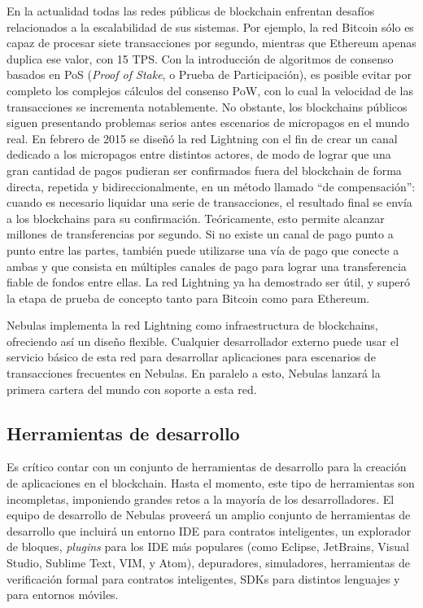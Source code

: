 En la actualidad todas las redes públicas de blockchain enfrentan desafíos relacionados a la escalabilidad de sus sistemas. Por ejemplo, la red Bitcoin sólo es capaz de procesar siete transacciones por segundo, mientras que Ethereum apenas duplica ese valor, con 15 TPS. Con la introducción de algoritmos de consenso basados en PoS (\textit{Proof of Stake}, o Prueba de Participación), es posible evitar por completo los complejos cálculos del consenso PoW, con lo cual la velocidad de las transacciones se incrementa notablemente. No obstante, los blockchains públicos siguen presentando problemas serios antes escenarios de micropagos en el mundo real. En febrero de 2015 se diseñó la red Lightning \cite{poon2015bitcoin} con el fin de crear un canal dedicado a los micropagos entre distintos actores, de modo de lograr que una gran cantidad de pagos pudieran ser confirmados fuera del blockchain de forma directa, repetida y bidireccionalmente, en un método llamado “de compensación”: cuando es necesario liquidar una serie de transacciones, el resultado final se envía a los blockchains para su confirmación. Teóricamente, esto permite alcanzar millones de transferencias por segundo. Si no existe un canal de pago punto a punto entre las partes, también puede utilizarse una vía de pago que conecte a ambas y que consista en múltiples canales de pago para lograr una transferencia fiable de fondos entre ellas. La red Lightning ya ha demostrado ser útil, y superó la etapa de prueba de concepto tanto para Bitcoin como para Ethereum.

Nebulas implementa la red Lightning como infraestructura de blockchains, ofreciendo así un diseño flexible. Cualquier desarrollador externo puede usar el servicio básico de esta red para desarrollar aplicaciones para escenarios de transacciones frecuentes en Nebulas. En paralelo a esto, Nebulas lanzará la primera cartera del mundo con soporte a esta red.

\subsection{Herramientas de desarrollo}

Es crítico contar con un conjunto de herramientas de desarrollo para la creación de aplicaciones en el blockchain. Hasta el momento, este tipo de herramientas son incompletas, imponiendo grandes retos a la mayoría de los desarrolladores. El equipo de desarrollo de Nebulas proveerá un amplio conjunto de herramientas de desarrollo que incluirá un entorno IDE para contratos inteligentes, un explorador de bloques, \textit{plugins} para los IDE más populares (como Eclipse, JetBrains, Visual Studio, Sublime Text, VIM, y Atom), depuradores, simuladores, herramientas de verificación formal para contratos inteligentes, SDKs para distintos lenguajes y para entornos móviles.